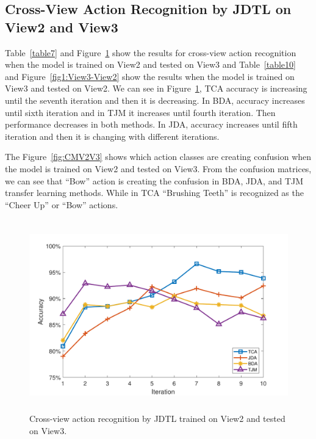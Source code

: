 \subsection{Cross-View Action Recognition by JDTL on View2 and View3}
Table~\ref{table7} and Figure~\ref{fig1:View2-View3} show the results for cross-view action recognition when the model is trained on View2 and tested on View3 and Table~\ref{table10} and Figure~\ref{fig1:View3-View2} show the results when the model is trained on View3 and tested on View2. We can see in Figure~\ref{fig1:View2-View3}, TCA accuracy is increasing until the seventh iteration and then it is decreasing. In BDA, accuracy increases until sixth iteration and in TJM it increases until fourth iteration. Then performance decreases in both methods. In JDA, accuracy increases until fifth iteration and then it is changing with different iterations.

The Figure~\ref{fig:CMV2V3} shows which action classes are creating confusion when the model is trained on View2 and tested on View3. From the confusion matrices, we can see that \enquote{Bow} action is creating the confusion in BDA, JDA, and TJM transfer learning methods. While in TCA \enquote{Brushing Teeth} is recognized as the \enquote{Cheer Up} or \enquote{Bow} actions.
\begin{figure}[hbt!]
	\centering
	\includegraphics[width=5in,height=3.25in]{figures/plots/View2-View3}
	\linebreak
	\caption{Cross-view action recognition by JDTL trained on View2 and tested on View3.}
	\label{fig1:View2-View3}
\end{figure}

